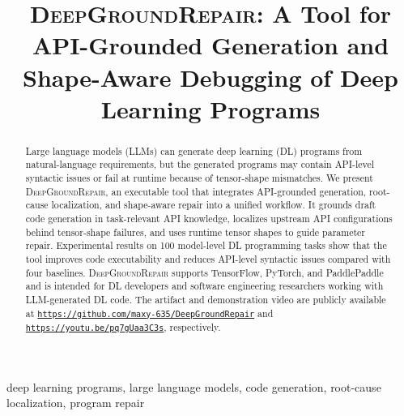 \documentclass[10pt,conference]{IEEEtran}
\begin{document}
\title{\textsc{DeepGroundRepair}: A Tool for API-Grounded Generation and Shape-Aware Debugging of Deep Learning Programs}

\author{
}

\maketitle

\begin{abstract}
Large language models (LLMs) can generate deep learning (DL) programs from natural-language requirements, but the generated programs may contain API-level syntactic issues or fail at runtime because of tensor-shape mismatches. We present \textsc{DeepGroundRepair}, an executable tool that integrates API-grounded generation, root-cause localization, and shape-aware repair into a unified workflow. It grounds draft code generation in task-relevant API knowledge, localizes upstream API configurations behind tensor-shape failures, and uses runtime tensor shapes to guide parameter repair. Experimental results on 100 model-level DL programming tasks show that the tool improves code executability and reduces API-level syntactic issues compared with four baselines. \textsc{DeepGroundRepair} supports TensorFlow, PyTorch, and PaddlePaddle and is intended for DL developers and software engineering researchers working with LLM-generated DL code. The artifact and demonstration video are publicly available at \texttt{\url{https://github.com/maxy-635/DeepGroundRepair}} and \texttt{\url{https://youtu.be/pq7gUaa3C3s}}, respectively.

\end{abstract}

\begin{IEEEkeywords}
deep learning programs, large language models, code generation, root-cause localization, program repair
\end{IEEEkeywords}
\end{document}
